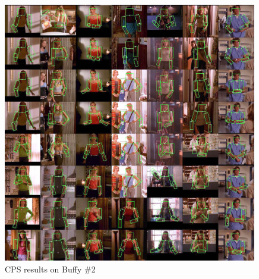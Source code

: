 \begin{figure}[tb]
\begin{center}
\includegraphics[width=0.99\textwidth]{figs/buffy_test_tiled_cps-2.jpg}
\caption[CPS results on Buffy\#2]{CPS results on Buffy \#2}
\label{fig:buffy-cps2}
\end{center}
\end{figure}
